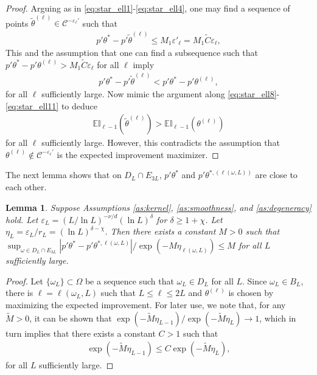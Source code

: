 \documentclass[letterpaper,11pt]{article}
\theoremstyle{myplain}
\newtheorem{lemma}{Lemma}[section]
\theoremstyle{mydefinition}
\theoremstyle{myremark}
\numberwithin{equation}{section}
\numberwithin{figure}{section}
\begin{document}
\begin{appendix}
\begin{proof}
Arguing as in \eqref{eq:star_ell1}-\eqref{eq:star_ell4}, one may find a sequence of points $\tilde\theta^{(\ell)}\in \mathcal C^{-\varepsilon_\ell'}$ such that
\begin{align}
p'\theta^*-p'\tilde\theta^{(\ell)}\le M_1 \varepsilon'_\ell= M_1\tilde C\varepsilon_\ell,\label{eq:star-current_inner1}
\end{align}
This and the assumption that one can find a subsequence such that $p'\theta^*-p'\theta^{(\ell)}>M_1\tilde C\varepsilon_\ell$ for all $\ell$ imply
\begin{align}
p'\theta^*-p'\tilde\theta^{(\ell)}<p'\theta^*-p'\theta^{(\ell)},\label{eq:star_current_inner2}
\end{align}
for all $\ell$ sufficiently large. Now mimic the argument along \eqref{eq:star_ell8}-\eqref{eq:star_ell11} to deduce
\begin{align}
\mathbb{EI}_{\ell-1}(\tilde\theta^{(\ell)})>\mathbb{EI}_{\ell-1}(\theta^{(\ell)})
\end{align}
for all $\ell$ sufficiently large. However, this contradicts the assumption that $\theta^{(\ell)}\notin \mathcal C^{-\varepsilon_\ell'}$ is the expected improvement maximizer.
\end{proof}

The next lemma shows that on $D_L\cap E_{3L}$, $p'\theta^*$ and $p'\theta^{*,(\ell(\omega,L))}$ are close to each other.
\begin{lemma}\label{lem:case3}
  Suppose Assumptions \ref{as:kernel}, \ref{as:smoothness}, and \ref{as:degeneracy} hold.	Let $\varepsilon_L=(L/\ln L)^{-\nu/d}(\ln L)^\delta$ for $\delta\ge 1+\chi$. Let $\eta_L=\varepsilon_L/r_L=(\ln L)^{\delta-\chi}$.  Then there exists a constant $M>0$ such that $\sup_{\omega\in D_L\cap E_{3L}}|p'\theta^*-p'\theta^{*,\ell(\omega,L)}|/\exp(-M\eta_{\ell(\omega,L)})\le M$ for all $L$ sufficiently large.
\end{lemma}

\begin{proof}
Let $\{\omega_L\}\subset\Omega$ be a sequence such that $\omega_L\in D_L$ for all $L$. 
Since $\omega_L \in B_L$, there is $\ell=\ell(\omega_L,L)$ such that $L\le \ell\le 2L$ and $\theta^{(\ell)}$ is chosen by maximizing the expected improvement.
For later use, we note that, for any $\tilde M>0$,
it  can be shown that $\exp(-\tilde M\eta_{L-1})/\exp(-\tilde M\eta_L)\to 1$, which in turn implies that there exists a constant $C>1$ such that
\begin{align}
	\exp(-\tilde M\eta_{L-1})\le C\exp(-\tilde M\eta_L),\label{eq:etabound2}
\end{align}
for all $L$ sufficiently large.


\end{proof}
\end{appendix}
\end{document}
